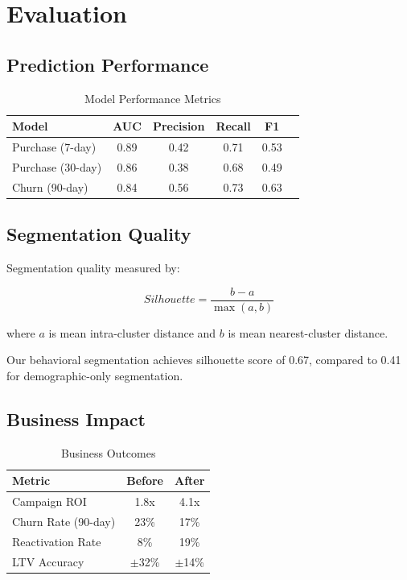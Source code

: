 \section{Evaluation}


\subsection{Prediction Performance}

\begin{table}[h]
\centering
\caption{Model Performance Metrics}
\begin{tabular}{lccccc}
\toprule
\textbf{Model} & \textbf{AUC} & \textbf{Precision} & \textbf{Recall} & \textbf{F1} \\
\midrule
Purchase (7-day) & 0.89 & 0.42 & 0.71 & 0.53 \\
Purchase (30-day) & 0.86 & 0.38 & 0.68 & 0.49 \\
Churn (90-day) & 0.84 & 0.56 & 0.73 & 0.63 \\
\bottomrule
\end{tabular}
\end{table}

\subsection{Segmentation Quality}

Segmentation quality measured by:

\begin{equation}
Silhouette = \frac{b - a}{\max(a, b)}
\end{equation}

where $a$ is mean intra-cluster distance and $b$ is mean nearest-cluster distance.

Our behavioral segmentation achieves silhouette score of 0.67, compared to 0.41 for demographic-only segmentation.

\subsection{Business Impact}

\begin{table}[h]
\centering
\caption{Business Outcomes}
\begin{tabular}{lcc}
\toprule
\textbf{Metric} & \textbf{Before} & \textbf{After} \\
\midrule
Campaign ROI & 1.8x & 4.1x \\
Churn Rate (90-day) & 23\% & 17\% \\
Reactivation Rate & 8\% & 19\% \\
LTV Accuracy & $\pm$32\% & $\pm$14\% \\
\bottomrule
\end{tabular}
\end{table}

